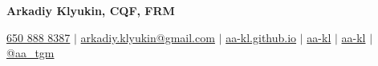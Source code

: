 \documentclass[letterpaper,hidelinks]{article}
\begin{document}


\begin{center}
  \textbf{\Huge{Arkadiy Klyukin, CQF, FRM}} \\ \vspace{1pt}
 
  \small
  \faMobile* \hspace{.5pt} \href{tel:+16508888387}{650 888 8387}
  $|$
  \faAt \hspace{.5pt} \href{mailto:arkadiy.klyukin@gmail.com}{arkadiy.klyukin@gmail.com}
  $|$
  \faGlobeAmericas \hspace{.5pt} \href{https://aa-kl.github.io}{aa-kl.github.io}
  $|$
  \faGithub \hspace{.5pt} \href{https://github.com/aa-kl}{aa-kl}
  $|$
  \faLinkedinIn \hspace{.5pt} \href{https://www.linkedin.com/in/aa-kl}{aa-kl}
  $|$
  \faTelegramPlane \hspace{.5pt} \href{https://t.me/aa_tgm}{@aa\_tgm}
\end{center}



\vspace{-25pt}
\end{document}
